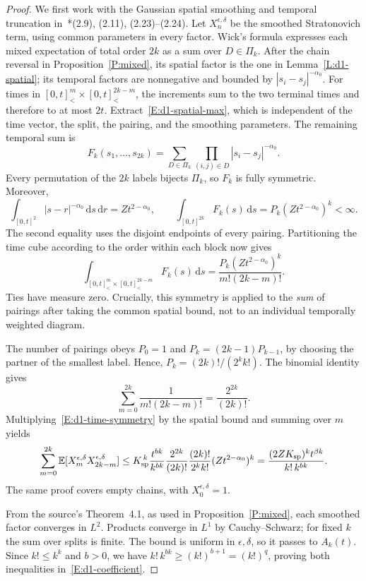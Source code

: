 \documentclass[12pt]{article}
\numberwithin{equation}{section}
\theoremstyle{definition}
\newcommand{\E}{\mathbb{E}}
\newcommand{\ud}{\,\mathrm{d}}
\begin{document}
\begin{proof}
  We first work with the Gaussian spatial smoothing and temporal
  truncation in~\cite{chen:author2026:time-dependency}*{(2.9), (2.11),
  (2.23)--(2.24)}.
  Let $X_n^{\epsilon,\delta}$ be the smoothed Stratonovich term, using
  common parameters in every factor. Wick's formula expresses each
  mixed expectation of total order $2k$ as a sum over $D\in\Pi_k$.
  After the chain reversal in Proposition~\ref{P:mixed}, its spatial
  factor is the one in Lemma~\ref{L:d1-spatial}; its temporal factors
  are nonnegative and bounded by $|s_i-s_j|^{-\alpha_0}$. For times
  in $[0,t]^m_<\times[0,t]^{2k-m}_<$, the increments sum to the two
  terminal times and therefore to at most $2t$.
  Extract~\eqref{E:d1-spatial-max}, which is independent of the
  time vector, the split, the pairing, and the smoothing parameters.
  The remaining temporal sum is
  \[
    F_k(s_1,\ldots,s_{2k})
    =\sum_{D\in\Pi_k}\prod_{(i,j)\in D}|s_i-s_j|^{-\alpha_0}.
  \]
  Every permutation of the $2k$ labels bijects $\Pi_k$, so $F_k$ is
  fully symmetric. Moreover,
  \[
    \int_{[0,t]^2}|s-r|^{-\alpha_0}\ud s\ud r
    =Zt^{2-\alpha_0},\qquad
    \int_{[0,t]^{2k}}F_k(s)\ud s
    =P_k(Zt^{2-\alpha_0})^k<\infty.
  \]
  The second equality uses the disjoint endpoints of every pairing.
  Partitioning the time cube according to the order within each block
  now gives
  \begin{equation}\label{E:d1-time-symmetry}
    \int_{[0,t]^m_<\times[0,t]^{2k-m}_<}F_k(s)\ud s
    =\frac{P_k(Zt^{2-\alpha_0})^k}{m!(2k-m)!}.
  \end{equation}
  Ties have measure zero. Crucially, this symmetry is applied to the
  \emph{sum} of pairings after taking the common spatial bound, not
  to an individual temporally weighted diagram.

  The number of pairings obeys $P_0=1$ and
  $P_k=(2k-1)P_{k-1}$, by choosing the partner of the smallest label.
  Hence, $P_k=(2k)!/(2^kk!)$. The binomial identity gives
  \[
    \sum_{m=0}^{2k}\frac1{m!(2k-m)!}=\frac{2^{2k}}{(2k)!}.
  \]
  Multiplying~\eqref{E:d1-time-symmetry} by the spatial bound and
  summing over $m$ yields
  \[
    \sum_{m=0}^{2k}\E[X_m^{\epsilon,\delta}X_{2k-m}^{\epsilon,\delta}]
    \le K_{\rm sp}^{\,k}\frac{t^{bk}}{k^{bk}}
    \frac{2^{2k}}{(2k)!}
    \frac{(2k)!}{2^kk!}(Zt^{2-\alpha_0})^k
    =\frac{(2ZK_{\rm sp})^kt^{\beta k}}{k!\,k^{bk}}.
  \]
  The same proof covers empty chains, with $X_0^{\epsilon,\delta}=1$.

  From the source's Theorem~4.1, as used in
  Proposition~\ref{P:mixed}, each smoothed factor converges in $L^2$.
  Products converge in $L^1$ by Cauchy--Schwarz; for fixed $k$ the sum
  over splits is finite. The bound is uniform in $\epsilon,\delta$,
  so it passes to $A_k(t)$. Since $k!\le k^k$ and $b>0$, we have
  $k!\,k^{bk}\ge(k!)^{b+1}=(k!)^q$, proving both inequalities
  in~\eqref{E:d1-coefficient}.


\end{proof}
\end{document}
